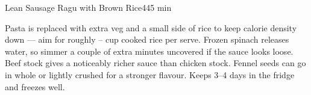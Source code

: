 \begin{recipebox}{Lean Sausage Ragu with Brown Rice}{4}{45 min}
\begin{notes}
Pasta is replaced with extra veg and a small side of rice to keep calorie density down --- aim for roughly -- cup cooked rice per serve. Frozen spinach releases water, so simmer a couple of extra minutes uncovered if the sauce looks loose. Beef stock gives a noticeably richer sauce than chicken stock. Fennel seeds can go in whole or lightly crushed for a stronger flavour. Keeps 3--4 days in the fridge and freezes well.
\end{notes}

\end{recipebox}
